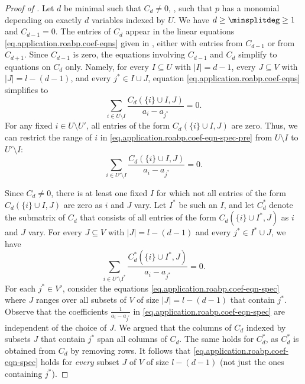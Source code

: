 \begin{proof}[Proof of ]
  Let \(d\) be minimal such that \(C_d\ne 0\),
  \ie, such that \(p\) has a monomial depending on exactly \(d\) variables
  indexed by \(U\).
  We have \(d \ge \minsplitdeg \ge 1\) and \(C_{d-1} = 0\).
  The entries of \(C_d\) appear in the linear equations
  \eqref{eq.application.roabp.coef-eqns} given in
  ,
  either with entries from \(C_{d-1}\) or from \(C_{d+1}\).
  Since \(C_{d-1}\) is zero,
  the equations involving \(C_{d-1}\) and \(C_d\) simplify to equations on
  \(C_d\) only.
  Namely, for every \(I\subseteq U\) with \(|I|=d-1\),
  every \(J\subseteq V\) with \(|J|=l-(d-1)\),
  and every \(j^* \in I\cup J\),
  equation \eqref{eq.application.roabp.coef-eqns} simplifies to
  \begin{equation}\label{eq.application.roabp.coef-eqn-spec-pre}
    \sum_{i\in U\setminus I} \frac{C_d(\{i\}\cup I, J)}{a_i - a_{j^*}} = 0.
  \end{equation}
  For any fixed $i \in U \setminus U'$,
  all entries of the form $C_d(\{i\}\cup I, J)$ are zero.
  Thus, we can restrict the range of $i$ in
  \eqref{eq.application.roabp.coef-eqn-spec-pre}
  from $U \setminus I$ to $U' \setminus I$:
  \begin{equation}\label{eq.application.roabp.coef-eqn-spec-mid}
    \sum_{i\in U'\setminus I} \frac{C_d(\{i\}\cup I, J)}{a_i - a_{j^*}} = 0.
  \end{equation}

  Since $C_d \ne 0$,
  there is at least one fixed $I$ for which not all entries of the form
  $C_d(\{i\} \cup I, J)$ are zero as \(i\) and \(J\) vary.
  Let $I^*$ be such an $I$,
  and let $C^*_d$ denote the submatrix of $C_d$
  that consists of all entries of the form $C_d(\{i\}\cup I^*,J)$
  as \(i\) and \(J\) vary.
  For every $J \subseteq V$ with $|J|=l-(d-1)$
  and every $j^* \in I^* \cup J$,
  we have
  \begin{equation}\label{eq.application.roabp.coef-eqn-spec}
    \sum_{i\in U'\setminus I^*}
      \frac{C^*_d(\{i\}\cup I^*, J)}{a_i - a_{j^*}}
    = 0.
  \end{equation}
  For each $j^* \in V'$,
  consider the equations \eqref{eq.application.roabp.coef-eqn-spec}
  where $J$ ranges over all subsets of $V$ of size $|J| = l-(d-1)$
  that contain $j^*$.
  Observe that the coefficients $\frac{1}{a_i - a_{j^*}}$ in
  \eqref{eq.application.roabp.coef-eqn-spec} are independent of the choice of
  $J$.
  We argued that the columns of $C_d$ indexed by subsets $J$ that contain
  $j^*$ span all columns of $C_d$.
  The same holds for $C^*_d$,
  as $C^*_d$ is obtained from $C_d$ by removing rows.
  It follows that \eqref{eq.application.roabp.coef-eqn-spec} holds for
  \emph{every} subset $J$ of $V$ of size $l-(d-1)$
  (not just the ones containing $j^*$).


\end{proof}
